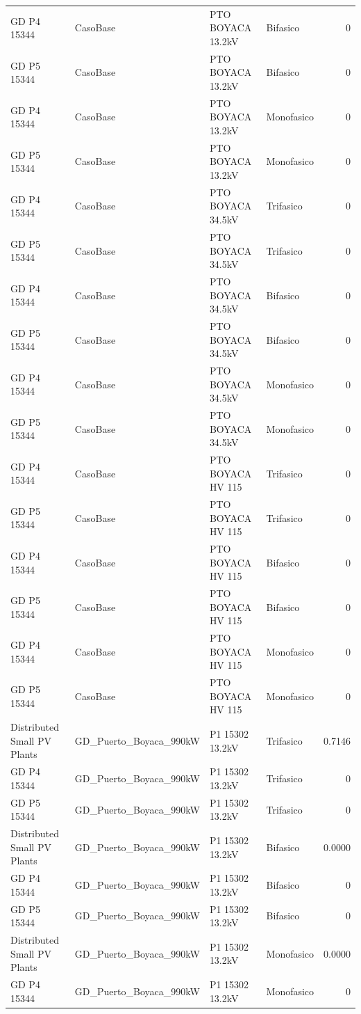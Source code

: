 \documentclass[11pt,a4paper]{article}
\begin{document}
\begin{longtable}{llllr}
GD P4 15344 & CasoBase & PTO BOYACA 13.2kV & Bifasico & 0 \\
GD P5 15344 & CasoBase & PTO BOYACA 13.2kV & Bifasico & 0 \\
GD P4 15344 & CasoBase & PTO BOYACA 13.2kV & Monofasico & 0 \\
GD P5 15344 & CasoBase & PTO BOYACA 13.2kV & Monofasico & 0 \\
GD P4 15344 & CasoBase & PTO BOYACA 34.5kV & Trifasico & 0 \\
GD P5 15344 & CasoBase & PTO BOYACA 34.5kV & Trifasico & 0 \\
GD P4 15344 & CasoBase & PTO BOYACA 34.5kV & Bifasico & 0 \\
GD P5 15344 & CasoBase & PTO BOYACA 34.5kV & Bifasico & 0 \\
GD P4 15344 & CasoBase & PTO BOYACA 34.5kV & Monofasico & 0 \\
GD P5 15344 & CasoBase & PTO BOYACA 34.5kV & Monofasico & 0 \\
GD P4 15344 & CasoBase & PTO BOYACA HV 115 & Trifasico & 0 \\
GD P5 15344 & CasoBase & PTO BOYACA HV 115 & Trifasico & 0 \\
GD P4 15344 & CasoBase & PTO BOYACA HV 115 & Bifasico & 0 \\
GD P5 15344 & CasoBase & PTO BOYACA HV 115 & Bifasico & 0 \\
GD P4 15344 & CasoBase & PTO BOYACA HV 115 & Monofasico & 0 \\
GD P5 15344 & CasoBase & PTO BOYACA HV 115 & Monofasico & 0 \\
Distributed Small PV Plants & GD\_Puerto\_Boyaca\_990kW & P1 15302 13.2kV & Trifasico & 0.7146 \\
GD P4 15344 & GD\_Puerto\_Boyaca\_990kW & P1 15302 13.2kV & Trifasico & 0 \\
GD P5 15344 & GD\_Puerto\_Boyaca\_990kW & P1 15302 13.2kV & Trifasico & 0 \\
Distributed Small PV Plants & GD\_Puerto\_Boyaca\_990kW & P1 15302 13.2kV & Bifasico & 0.0000 \\
GD P4 15344 & GD\_Puerto\_Boyaca\_990kW & P1 15302 13.2kV & Bifasico & 0 \\
GD P5 15344 & GD\_Puerto\_Boyaca\_990kW & P1 15302 13.2kV & Bifasico & 0 \\
Distributed Small PV Plants & GD\_Puerto\_Boyaca\_990kW & P1 15302 13.2kV & Monofasico & 0.0000 \\
GD P4 15344 & GD\_Puerto\_Boyaca\_990kW & P1 15302 13.2kV & Monofasico & 0 \\

\end{longtable}
\end{document}
